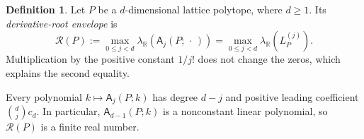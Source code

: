 \documentclass[reqno, 12pt]{article}
\numberwithin{equation}{section}
\theoremstyle{definition}
\newtheorem{definition}[theorem]{Definition}
\newcommand{\R}{\mathbb{R}}
\newcommand{\A}{\mathsf{A}}
\begin{document}
\begin{definition}\label{def:derivative-root-envelope}
Let $P$ be a $d$-dimensional lattice polytope, where $d\geq1$.  Its
\emph{derivative-root envelope} is
\begin{equation}\label{eq:derivative-root-envelope}
 \mathcal R(P):=\max_{0\leq j<d}\lambda_{\R}\!\left(\A_j(P;\,\cdot\,)\right)=\max_{0\leq j<d}\lambda_{\R}\!\left(L_P^{(j)}\right).
\end{equation}
Multiplication by the positive constant $1/j!$ does not change the zeros, which explains the second equality.
\end{definition}

Every polynomial $k\mapsto\A_j(P;k)$ has degree $d-j$ and positive leading coefficient $\binom{d}{j}c_d$.
In particular, $\A_{d-1}(P;k)$ is a nonconstant linear polynomial, so $\mathcal R(P)$ is a finite real number.
\end{document}

